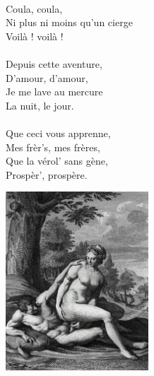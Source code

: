 {\\Coula, coula,
\\Ni plus ni moins qu'un cierge
\\Voilà ! voilà !
\\\\Depuis cette aventure,
\\D'amour, d'amour,
\\Je me lave au mercure
\\La nuit, le jour.
\\\\Que ceci vous apprenne,
\\Mes frèr's, mes frères,
\\Que la vérol' sans gène,
\\Prospèr', prospère.
\\
\begin{center}
\includegraphics[width=0.4\textwidth]{images/margot.jpg}
\end{center}
}

\breakpage